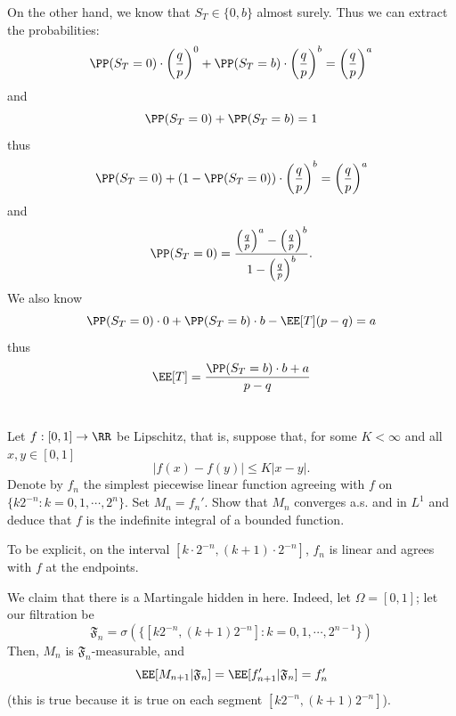 \documentclass[11pt, headheight=30pt]{scrartcl}
\begin{document}
On the other hand, we know that $S_T\in \{0, b\}$ almost surely. Thus we can extract
the probabilities:
\[
    \PP(S_T = 0)\cdot \left(\frac{q}{p}\right)^0 + \PP(S_T = b)\cdot \left(\frac{q}{p}\right)^b = \left(\frac{q}{p}\right)^a    
\]
and
\[
    \PP(S_T = 0) + \PP(S_T = b) = 1
\]
thus
\[
    \PP(S_T = 0) + (1 - \PP(S_T = 0))\cdot \left(\frac{q}{p}\right)^b = \left(\frac{q}{p}\right)^a    
\]
and
\[
    \PP(S_T = 0) = \frac{\left(\frac{q}{p}\right)^a - \left(\frac{q}{p}\right)^b}{1 - \left(\frac{q}{p}\right)^b}.
\]
We also know
\[
    \PP(S_T = 0)\cdot 0 + \PP(S_T = b)\cdot b - \EE[T](p-q) = a  
\]
thus
\[
    \EE[T] = \frac{\PP(S_T = b)\cdot b + a}{p - q}    
\]



\section{}
\begin{prob*}
    Let $f : [0, 1] \to \RR$ be Lipschitz, that is, suppose that, for some $K < \infty$ and all
    $x, y \in [0, 1]$
    \[
        |f(x) - f(y)| \leq K|x - y|.
    \]
    Denote by $f_n$ the simplest piecewise linear function agreeing with $f$ on $\{k2^{-n} : k = 0, 1, \cdots , 2^n\}$.
    Set $M_n = f_n'$. Show that $M_n$ converges a.s. and in $L^1$ and deduce that $f$ is the indefinite integral of
    a bounded function.
\end{prob*}
To be explicit, on the interval $[k\cdot 2^{-n}, (k + 1)\cdot 2^{-n}]$, $f_n$
is linear and agrees with $f$ at the endpoints.


We claim that there is a Martingale hidden in here. Indeed, let $\Omega = [0,1]$;
let our filtration be
\[
    \mathfrak{F}_n = \sigma(\{[k2^{-n}, (k + 1) 2^{-n}] : k = 0, 1, \cdots , 2^{n-1}\})
\]
Then, $M_n$ is $\mathfrak{F}_n$-measurable, and
\[
    \EE[M_{n+1} | \mathfrak{F}_n] = \EE[f_{n+1}' | \mathfrak{F}_n] = f_n'    
\]
(this is true because it is true on each segment $[k2^{-n}, (k+1)2^{-n}]$).
\end{document}
